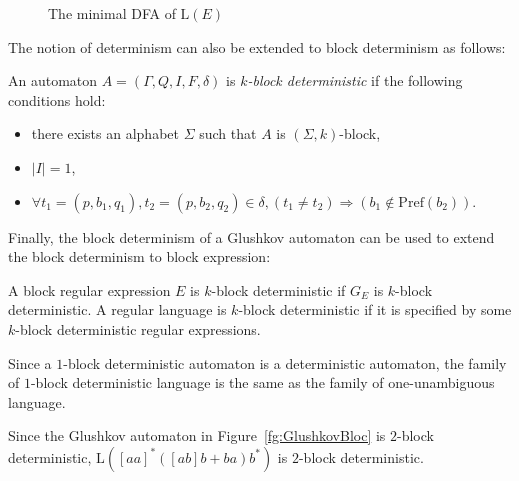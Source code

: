 \documentclass{llncs}
\begin{document}
\begin{figure}[H]
	\centering
	

  \caption{The minimal DFA of $\mathrm{L}(E)$}
  \label{fg:mdfa_kbd}
\end{figure}

The notion of determinism can also be extended to block determinism as follows:

\begin{definition}
	An automaton $A = (\Gamma, Q, I, F, \delta)$ is $k$\emph{-block deterministic} if the following conditions hold:
		\begin{itemize}
			\item there exists an alphabet $\Sigma$ such that $A$ is $(\Sigma, k)$-block,
			\item $|I| = 1$,
			\item $\forall t_1 = (p, b_1, q_1), t_2 = (p, b_2, q_2) \in \delta, (t_1 \neq t_2) \Longrightarrow (b_1 \notin \mathrm{Pref}(b_2))$.
		\end{itemize}
\end{definition}	

Finally, the block determinism of a Glushkov automaton can be used to extend the block determinism to block expression:

\begin{definition}
	A block regular expression $E$ is $k$-block deterministic if $G_E$ is $k$-block deterministic.
	A regular language is $k$-block deterministic if it is specified by some $k$-block deterministic regular expressions.
\end{definition}

Since a $1$-block deterministic automaton is a deterministic automaton, the family of $1$-block deterministic language is the same as the family of one-unambi\-guous language.

\begin{example}
	Since the Glushkov automaton in Figure~\ref{fg:GlushkovBloc} is $2$-block deterministic, $\mathrm{L}([aa]^*([ab]b + ba)b^*)$ is $2$-block deterministic.
\end{example}
	
\end{document}
